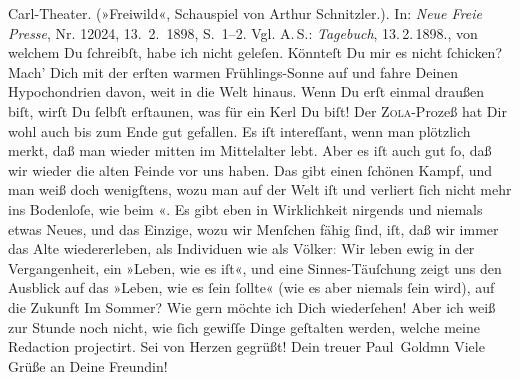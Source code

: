\begin{ledgroupsized}[t]{13cm}
{{{{                        Carl-Theater. (»Freiwild«, Schauspiel von Arthur Schnitzler.)}. In: \emph{Neue Freie Presse}, Nr. 12024, 13. 2. 1898, S. 1–2. Vgl. A. S.: \emph{Tagebuch}, 13. 2. 1898.}}}\label{K_L02839-8h}, von
               welchem Du ſchreibſt, habe ich nicht geleſen. Könnteſt Du mir es nicht ſchicken?\pend
           \pstart
           Mach’ Dich mit der erſten warmen Frühlings-Sonne auf und fahre Deinen Hypochondrien
               davon, weit in die Welt hinaus. Wenn Du erſt einmal draußen biſt, wirſt Du ſelbſt
               erſtaunen, was für ein Kerl Du biſt!\pend
           \pstart
           Der \textsc{Zola}-Prozeß hat Dir wohl auch bis zum Ende gut gefallen. Es iſt intereſſant,  wenn man plötzlich merkt, daß man wieder mitten im
               Mittelalter lebt. Aber es iſt auch gut ſo, daß \strikeout{\textcolor{gray}{w}} wir wieder die alten Feinde vor uns haben.  Das gibt einen ſchönen Kampf, und {\pb}man weiß
               doch wenigſtens, \strikeout{\textcolor{gray}{e}} wozu man auf der Welt iſt und verliert ſich nicht mehr ins Bodenloſe, wie beim
                  \label{K_L02839-9v}\label{K_L02839-9h}«. Es gibt eben in Wirklichkeit nirgends  und
               niemals etwas Neues, und das Einzige, wozu wir Menſchen fähig ſind, iſt, daß wir
               immer das Alte wiedererleben, als Individuen wie als Völker\textcolor{gray}{:} Wir
               leben ewig in der Vergangenheit, ein »Leben, wie es iſt«, und eine Sinnes-Täuſchung
               zeigt uns den Ausblick auf das »Leben, wie es ſein ſollte« (wie es aber niemals ſein
               wird),  auf die Zukunft{\dotsfive}\pend
           \pstart
           Im Sommer? Wie gern möchte ich Dich wiederſehen! Aber ich weiß zur Stunde noch nicht,
               wie ſich gewiſſe Dinge geſtalten werden, welche meine Redaction projectirt. Sei von Herzen
               gegrüßt!\pend
           \pstart Dein treuer \spacefill\mbox{Paul Goldmn}\pend{}\pstart
           \noindent{}Viele Grüße an Deine Freundin!\pend
           

\end{ledgroupsized}
